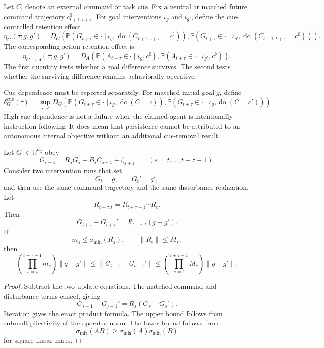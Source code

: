 
Let \(C_t\) denote an external command or task cue. Fix a neutral or matched
future command trajectory \(c_{t+1:t+\tau}^{0}\). For goal interventions
\(\iota_g\) and \(\iota_{g'}\), define the cue-controlled retention effect
\[
\eta_G(\tau;g,g')
=
D_G
\left(
\mathbb P
\left(
G_{t+\tau}\in\cdot
\mid
\iota_g,
\operatorname{do}(C_{t+1:t+\tau}=c^0)
\right),
\mathbb P
\left(
G_{t+\tau}\in\cdot
\mid
\iota_{g'},
\operatorname{do}(C_{t+1:t+\tau}=c^0)
\right)
\right).
\]
The corresponding action-retention effect is
\[
\eta_{G\to A}(\tau;g,g')
=
D_A
\left(
\mathbb P(A_{t+\tau}\in\cdot\mid\iota_g,c^0),
\mathbb P(A_{t+\tau}\in\cdot\mid\iota_{g'},c^0)
\right).
\]
The first quantity tests whether a goal difference survives. The second tests
whether the surviving difference remains behaviorally operative.

Cue dependence must be reported separately. For matched initial goal \(g\),
define
\[
\delta_G^{\mathrm{cue}}(\tau)
=
\sup_{c,c'}
D_G
\left(
\mathbb P(G_{t+\tau}\in\cdot\mid\iota_g,\operatorname{do}(C=c)),
\mathbb P(G_{t+\tau}\in\cdot\mid\iota_g,\operatorname{do}(C=c'))
\right).
\]
High cue dependence is not a failure when the claimed agent is intentionally
instruction following. It does mean that persistence cannot be attributed to
an autonomous internal objective without an additional cue-removal result.


\begin{theorem}
\label{thm:goal-retention}
Let \(G_s\in\mathbb R^{d_G}\) obey
\[
G_{s+1}
=
R_sG_s+B_sC_{s+1}+\zeta_{s+1}
\qquad
(s=t,\ldots,t+\tau-1).
\]
Consider two intervention runs that set
\[
G_t=g,
\qquad
G_t'=g',
\]
and then use the same command trajectory and the same disturbance realization.
Let
\[
R_{t+\tau:t}
=
R_{t+\tau-1}\cdots R_t.
\]
Then
\[
\boxed{
G_{t+\tau}-G_{t+\tau}'
=
R_{t+\tau:t}(g-g').
}
\]
If
\[
m_s
\leq
\sigma_{\min}(R_s),
\qquad
\|R_s\|\leq M_s,
\]
then
\[
\boxed{
\left(
\prod_{s=t}^{t+\tau-1}m_s
\right)
\|g-g'\|
\leq
\|G_{t+\tau}-G_{t+\tau}'\|
\leq
\left(
\prod_{s=t}^{t+\tau-1}M_s
\right)
\|g-g'\|.
}
\]
\end{theorem}

\begin{proof}
Subtract the two update equations. The matched command and disturbance terms
cancel, giving
\[
G_{s+1}-G_{s+1}'
=
R_s(G_s-G_s').
\]
Iteration gives the exact product formula. The upper bound follows from
submultiplicativity of the operator norm. The lower bound follows from
\[
\sigma_{\min}(AB)
\geq
\sigma_{\min}(A)\sigma_{\min}(B)
\]
for square linear maps.
\end{proof}

